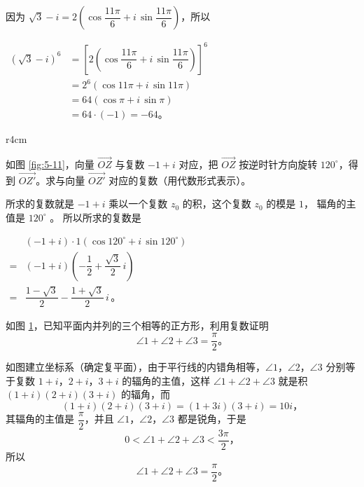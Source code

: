 \jie 因为 $\sqrt{3} - i = 2 \left( \cos\dfrac{11\pi}{6} + i\, \sin\dfrac{11\pi}{6} \right)$，所以

$\begin{aligned}
    (\sqrt{3} - i)^6 &= \left[ 2 \left( \cos\dfrac{11\pi}{6} + i\, \sin\dfrac{11\pi}{6} \right)\right]^6 \\
    &= 2^6 (\cos 11\pi + i\, \sin 11\pi) \\
    &= 64 (\cos\pi + i\, \sin\pi) \\
    &= 64 \cdot (-1) = -64 \text{。}
\end{aligned}$


\begin{wrapfigure}[22]{r}{4cm}
    \centering
    
    \caption{}\label{fig:5-11}
\end{wrapfigure}

\liti 如图 \ref{fig:5-11}，向量 $\overrightarrow{OZ}$ 与复数 $-1 + i$ 对应，把 $\overrightarrow{OZ}$
按逆时针方向旋转 $120^\circ$，得到 $\overrightarrow{OZ'}$。求与向量 $\overrightarrow{OZ'}$
对应的复数（用代数形式表示）。

\jie 所求的复数就是 $-1 + i$ 乘以一个复数 $z_0$ 的积，这个复数 $z_0$ 的模是 $1$，
辐角的主值是 $120^\circ$ 。 所以所求的复数是

$\begin{aligned}
        & (-1 + i) \cdot 1 (\cos 120^\circ + i\, \sin 120^\circ) \\
    ={} & (-1 + i)\left( -\dfrac{1}{2} + \dfrac{\sqrt{3}}{2} \, i \right) \\
    ={} & \dfrac{1 - \sqrt{3}}{2} - \dfrac{1 + \sqrt{3}}{2} \, i \, \text{。}
\end{aligned}$


\liti 如图 \ref{fig:5-12}，已知平面内并列的三个相等的正方形，利用复数证明
$$ \angle 1 + \angle 2 + \angle 3 = \dfrac{\pi}{2} \text{。} $$

\begin{figure}[htbp]
    \centering
    
    \caption{}\label{fig:5-12}
\end{figure}

\zhengming 如图建立坐标系（确定复平面），由于平行线的内错角相等，$\angle 1$，$\angle 2$，$\angle 3$
分别等于复数 $1 + i$，$2 + i$，$3 + i$ 的辐角的主值，这样 $\angle 1 + \angle 2 + \angle 3$
就是积 $(1 + i)(2 + i)(3 + i)$ 的辐角，而
$$ (1 + i)(2 + i)(3 + i) = (1 + 3i)(3 + i) = 10i \text{，}$$
其辐角的主值是 $\dfrac{\pi}{2}$，并且 $\angle 1$，$\angle 2$，$\angle 3$ 都是锐角，于是
$$ 0 < \angle 1 + \angle 2 + \angle 3 < \dfrac{3\pi}{2} \text{，} $$
所以
$$ \angle 1 + \angle 2 + \angle 3 = \dfrac{\pi}{2} \text{。} $$



